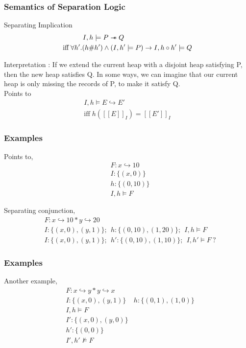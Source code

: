 \documentclass{beamer}
\newcommand\sepimp{\mathrel{-\mkern-6mu*}}
\begin{document}
\begin{frame}
\frametitle{Semantics of Separation Logic}

Separating Implication
\begin{align*}
    I,h \models P \sepimp Q \hspace{3.5cm} \\ 
    \textrm{iff} \; \forall h'.(h \# h') \land (I,h' \models P) \to I,h \circ h' \models Q
\end{align*}

Interpretation : If we extend the current heap with a disjoint heap satisfying P, then the new heap satisfies Q. In some ways, we can imagine that our current heap is only missing the records of P, to make it satisfy Q.
\vspace{0.5cm} \\

Points to
\begin{align*}
    I,h \models E \hookrightarrow E' \\ 
    \textrm{iff} \; h([\![ E ]\!]_I) = [\![ E' ]\!]_I
\end{align*}
\end{frame}

\begin{frame}
\frametitle{Examples}
Points to, 
\begin{align*}
    & F : x \hookrightarrow 10 \\
    & I : \{(x,0)\} \\
    & h : \{(0,10)\} \\
    & I,h \models F
\end{align*}

Separating conjunction,
\begin{align*}
    & F : x \hookrightarrow 10 * y \hookrightarrow 20 \\
    & I : \{ (x,0), (y,1) \};~~h : \{(0,10), (1,20)\};~~I,h \models F \\[0.15cm]
    & I : \{ (x,0), (y,1) \};~~h' : \{(0,10), (1,10)\};~~I,h' \models F~?
\end{align*}
\end{frame}

\begin{frame}
\frametitle{Examples}
Another example,
\begin{align*}
    & F : x \hookrightarrow y * y \hookrightarrow x \\
    & I : \{(x,0), (y,1)\}
    & h : \{(0,1), (1, 0)\} \\
    & I,h \models F \\[0.15cm]
    & I' : \{(x,0), (y,0)\} \\
    & h' : \{(0,0)\} \\
    & I',h' \not\models F
\end{align*}
\end{frame}
\end{document}
